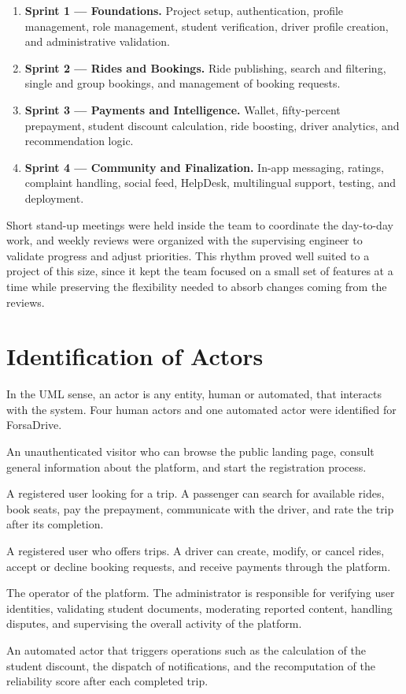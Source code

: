 \begin{enumerate}[noitemsep]
    \item \textbf{Sprint 1 — Foundations.} Project setup, authentication, profile management, role management, student verification, driver profile creation, and administrative validation.
    \item \textbf{Sprint 2 — Rides and Bookings.} Ride publishing, search and filtering, single and group bookings, and management of booking requests.
    \item \textbf{Sprint 3 — Payments and Intelligence.} Wallet, fifty-percent prepayment, student discount calculation, ride boosting, driver analytics, and recommendation logic.
    \item \textbf{Sprint 4 — Community and Finalization.} In-app messaging, ratings, complaint handling, social feed, HelpDesk, multilingual support, testing, and deployment.
\end{enumerate}

Short stand-up meetings were held inside the team to coordinate the day-to-day work, and weekly reviews were organized with the supervising engineer to validate progress and adjust priorities. This rhythm proved well suited to a project of this size, since it kept the team focused on a small set of features at a time while preserving the flexibility needed to absorb changes coming from the reviews.


\section{Identification of Actors}

In the UML sense, an actor is any entity, human or automated, that interacts with the system. Four human actors and one automated actor were identified for ForsaDrive.

\begin{description}[noitemsep]
    \item[Guest.] An unauthenticated visitor who can browse the public landing page, consult general information about the platform, and start the registration process.
    \item[Passenger.] A registered user looking for a trip. A passenger can search for available rides, book seats, pay the prepayment, communicate with the driver, and rate the trip after its completion.
    \item[Driver.] A registered user who offers trips. A driver can create, modify, or cancel rides, accept or decline booking requests, and receive payments through the platform.
    \item[Administrator.] The operator of the platform. The administrator is responsible for verifying user identities, validating student documents, moderating reported content, handling disputes, and supervising the overall activity of the platform.
    \item[System.] An automated actor that triggers operations such as the calculation of the student discount, the dispatch of notifications, and the recomputation of the reliability score after each completed trip.
\end{description}

